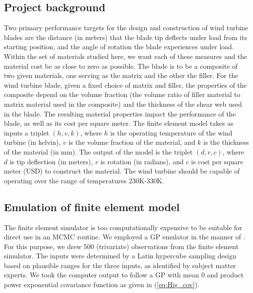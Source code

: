 \documentclass[12pt]{article}
\begin{document}
\subsection{Project background}

Two primary performance targets for the design and construction of wind turbine blades are the distance (in meters) that the blade tip deflects under load from its starting position, and the angle of rotation the blade experiences under load.
%
Within the set of materials studied here, we want each of these measures and the material cost be as close to zero as possible.
%
The blade is to be a composite of two given materials, one serving as the matrix and the other the filler. 
%
For the wind turbine blade, given a fixed choice of matrix and filler, the properties of the composite depend on the volume fraction (the volume ratio of filler material to matrix material used in the composite) and the thickness of the shear web used in the blade. 
%
The resulting material properties impact the performance of the blade, as well as its cost per square meter. 
%
The finite element model takes as inputs a triplet $(h,v,k)$, where $h$ is the operating temperature of the wind turbine (in kelvin), $v$ is the volume fraction of the material, and $k$ is the thickness of the material (in mm). 
%
The output of the model is the triplet $(d,r,c)$, where $d$ is tip deflection (in meters), $r$ is rotation (in radians), and $c$ is cost per square meter (USD) to construct the material.
% 
The wind turbine should be capable of operating over the range of temperatures 230K-330K. 
%

\subsection{Emulation of finite element model}\label{emulator}
The finite element simulator is too computationally expensive to be suitable for direct use in an MCMC routine. 
%
We employed a GP emulator in the manner of \cite{Williams2006}. 
%
For this purpose, we drew 500 (trivariate) observations from the finite element simulator. 
%
The inputs were determined by a Latin hypercube sampling design \citep{McKay1979} based on plausible ranges for the three inputs, as identified by subject matter experts.
%
We took the computer output to follow a GP with mean 0 and product power exponential covariance function as given in (\ref{eq:Hig_cov}).
%
\end{document}

